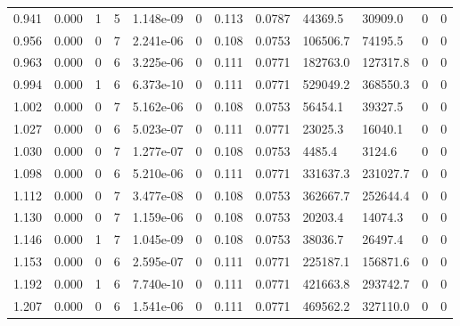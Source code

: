 \documentclass[preview]{standalone}
\begin{document}
{{\begin{tabular}{L{1.2cm}C{1.2cm} C{0.3cm}C{0.5cm} C{1.4cm}C{1.4cm} C{1.4cm}C{1.4cm} C{1.6cm}C{1.6cm} C{1.6cm}C{1.6cm}}
  0.941  &  0.000  & 1     &  5 &  1.148e-09  & 0  &  0.113&   0.0787& 44369.5 & 30909.0   &  0 & 0  \\ 
  0.956  &  0.000  & 0     &  7 &  2.241e-06  & 0  &  0.108&   0.0753& 106506.7 & 74195.5   &  0 & 0  \\ 
  0.963  &  0.000  & 0     &  6 &  3.225e-06  & 0  &  0.111&   0.0771& 182763.0 & 127317.8   &  0 & 0  \\ 
  0.994  &  0.000  & 1     &  6 &  6.373e-10  & 0  &  0.111&   0.0771& 529049.2 & 368550.3   &  0 & 0  \\ 
  1.002  &  0.000  & 0     &  7 &  5.162e-06  & 0  &  0.108&   0.0753& 56454.1 & 39327.5   &  0 & 0  \\ 
  1.027  &  0.000  & 0     &  6 &  5.023e-07  & 0  &  0.111&   0.0771& 23025.3 & 16040.1   &  0 & 0  \\ 
  1.030  &  0.000  & 0     &  7 &  1.277e-07  & 0  &  0.108&   0.0753& 4485.4 & 3124.6   &  0 & 0  \\ 
  1.098  &  0.000  & 0     &  6 &  5.210e-06  & 0  &  0.111&   0.0771& 331637.3 & 231027.7   &  0 & 0  \\ 
  1.112  &  0.000  & 0     &  7 &  3.477e-08  & 0  &  0.108&   0.0753& 362667.7 & 252644.4   &  0 & 0  \\ 
  1.130  &  0.000  & 0     &  7 &  1.159e-06  & 0  &  0.108&   0.0753& 20203.4 & 14074.3   &  0 & 0  \\ 
  1.146  &  0.000  & 1     &  7 &  1.045e-09  & 0  &  0.108&   0.0753& 38036.7 & 26497.4   &  0 & 0  \\ 
  1.153  &  0.000  & 0     &  6 &  2.595e-07  & 0  &  0.111&   0.0771& 225187.1 & 156871.6   &  0 & 0  \\ 
  1.192  &  0.000  & 1     &  6 &  7.740e-10  & 0  &  0.111&   0.0771& 421663.8 & 293742.7   &  0 & 0  \\ 
  1.207  &  0.000  & 0     &  6 &  1.541e-06  & 0  &  0.111&   0.0771& 469562.2 & 327110.0   &  0 & 0  \\ 
\hline 
\end{tabular} 

}}
\end{document}
